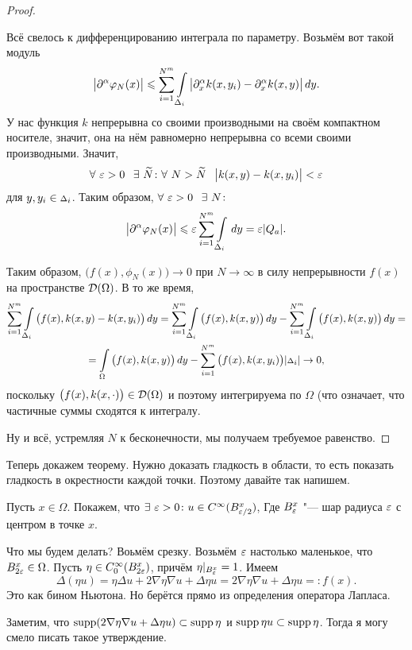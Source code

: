 \begin{Proof}
\begin{proof}
\begin{roItems}
Всё свелось к дифференцированию интеграла по параметру. Возьмём вот такой модуль
\[
  \big|\partial^\alpha\varphi_N(x)\big|\leqslant
  \sum\limits_{i = 1}^{N^m} \int\limits_{{\scriptstyle\Delta}_i} \big|\partial_x^\alpha k(x,y_i) - \partial^\alpha_x k(x,y)\big|\,dy.
\]
У нас функция $k$ непрерывна со своими производными на своём компактном носителе, значит, она на нём равномерно непрерывна со всеми своими производными. Значит, 
\[
\forall\ \e>0\pau\exists\ \Til N\colon \forall\ N>\Til N\pau \big|k(x,y) - k(x,y_i)\big|<\e\]
 для $y,y_i\in {\scriptstyle\Delta}_i$.
Таким образом, $\forall\ \e>0\pau \exists\ N\colon$ 
\[
  \big|\partial^\alpha\varphi_N(x)\big|\leqslant
  \varepsilon \sum\limits_{i = 1}^{N^m} \int\limits_{{\scriptstyle\Delta}_i}\,dy = \varepsilon|Q_a|.
\]
\end{roItems}
Таким образом, $\big(f(x),\phi_N(x)\big)\to0 $ при $N\to\infty$ в силу непрерывности $f(x)$ на пространстве $\mathcal D(\Omega)$. В то же время,
\begin{multline*}
  \sum\limits_{i = 1}^{N^m}\int\limits_{{\scriptstyle\Delta}_i} \big(f(x),k(x,y) - k(x,y_i)\big)\,dy = 
  \sum\limits_{i = 1}^{N^m}\int\limits_{{\scriptstyle\Delta}_i} \big(f(x),k(x,y)\big)\,dy -
  \sum\limits_{i = 1}^{N^m}\int\limits_{{\scriptstyle\Delta}_i} \big(f(x),k(x,y)\big)\,dy = \\
  =
  \int\limits_{\Omega}\big(f(x),k(x,y)\big)\,dy - 
    \sum\limits_{i = 1}^{N^m} \big(f(x),k(x,y_i)\big)|{\scriptstyle\Delta}_i| \rightarrow 0,
\end{multline*}
поскольку $\big(f(x),k(x,\cdot)\big)\in\mathcal D(\Omega)$ и поэтому интегрируема по $\Omega$ (что означает, что частичные суммы сходятся к интегралу.

Ну и всё, устремляя $N$ к бесконечности, мы получаем требуемое равенство.
\end{proof}

Теперь докажем теорему. Нужно доказать гладкость в области, то есть показать гладкость в окрестности каждой точки. Поэтому давайте так напишем.

Пусть $x\in\Omega$. Покажем, что $\exists\ \varepsilon>0\colon u\in C^{\infty}(B^x_{\varepsilon/2})$, Где $B_\varepsilon^x$ "--- шар радиуса $\varepsilon$ с центром в точке $x$.

Что мы будем делать? Воьмём срезку. Возьмём $\varepsilon$ настолько маленькое, что $B_{2\varepsilon}^x\in\Omega$. Пусть $\eta\in C^\infty_0(B_{2\varepsilon}^x)$, причём $\eta|_{B_\varepsilon^x} = 1$.
Имеем 
\[
  \Delta(\eta u) = \eta\Delta u + 2\nabla\eta\nabla u + \Delta\eta u = 2\nabla\eta\nabla u + \Delta\eta u = :f(x).
\]
Это как бином Ньютона. Но берётся прямо из определения оператора Лапласа.

Заметим, что $\operatorname{supp}( 2\nabla\eta\nabla u + \Delta\eta u)\subset \operatorname{supp}\eta$ и $\operatorname{supp}\eta u\subset\operatorname{supp}\eta$. Тогда я могу смело писать такое утверждение.


\end{Proof}
